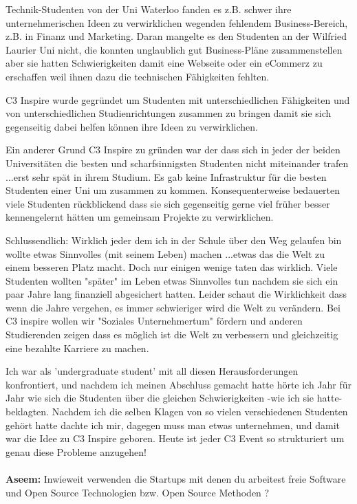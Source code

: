 Technik-Studenten von der Uni Waterloo fanden es z.B. schwer ihre 
unternehmerischen Ideen zu verwirklichen wegenden fehlendem 
Business-Bereich, z.B. in Finanz und Marketing. 
Daran mangelte es den Studenten an der Wilfried Laurier Uni nicht, die 
konnten unglaublich gut Business-Pläne zusammenstellen aber sie hatten 
Schwierigkeiten damit eine Webseite oder ein eCommerz zu erschaffen 
weil ihnen dazu die technischen Fähigkeiten fehlten. 

C3 Inspire wurde gegründet um Studenten mit unterschiedlichen 
Fähigkeiten und von unterschiedlichen Studienrichtungen zusammen zu 
bringen damit sie sich gegenseitig dabei helfen können ihre Ideen zu 
verwirklichen. 

Ein anderer Grund C3 Inspire zu gründen war der dass sich in jeder der 
beiden Universitäten die besten und scharfsinnigsten Studenten nicht 
miteinander trafen ...erst sehr spät in ihrem Studium. Es gab keine 
Infrastruktur für die besten Studenten einer Uni um zusammen zu kommen. 
Konsequenterweise bedauerten viele Studenten rückblickend dass sie 
sich gegenseitig gerne viel früher besser kennengelernt hätten um 
gemeinsam Projekte zu verwirklichen. 

Schlussendlich: Wirklich jeder dem ich in der Schule über den Weg 
gelaufen bin wollte etwas Sinnvolles (mit seinem Leben) machen ...etwas 
das die Welt zu einem besseren Platz macht. Doch nur einigen wenige 
taten das wirklich. Viele Studenten wollten "später" im Leben etwas 
Sinnvolles tun nachdem sie sich ein paar Jahre lang finanziell 
abgesichert hatten. Leider schaut die Wirklichkeit dass wenn die 
Jahre vergehen, es immer schwieriger wird die Welt zu verändern. Bei 
C3 inspire wollen wir "Soziales Unternehmertum" fördern und anderen 
Studierenden zeigen dass es möglich ist die Welt zu verbessern und 
gleichzeitig eine bezahlte Karriere zu machen. 

Ich war als 'undergraduate student' mit all diesen Herausforderungen 
konfrontiert, und nachdem ich meinen Abschluss gemacht hatte hörte ich 
Jahr für Jahr wie sich die Studenten über die gleichen 
Schwierigkeiten -wie ich sie hatte- beklagten. Nachdem ich die selben 
Klagen von so vielen verschiedenen Studenten gehört hatte dachte ich  
mir, dagegen muss man etwas unternehmen, und damit war die Idee zu C3 
Inspire geboren. Heute ist jeder C3 Event so strukturiert um genau 
diese Probleme anzugehen! 

\paragraph{}
\textbf{Aseem:} Inwieweit verwenden die Startups mit denen du arbeitest freie 
Software und Open Source Technologien bzw. Open Source Methoden ?

